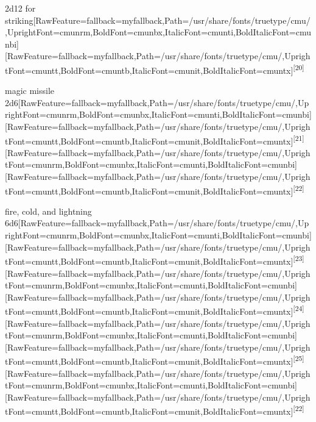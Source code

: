 \begin{myitemize}\item{}2d12 for striking\footnotemark[111]\allowbreak{}\setmainfont{cmunrm.ttf}[RawFeature={fallback=myfallback},Path=/usr/share/fonts/truetype/cmu/,UprightFont=cmunrm,BoldFont=cmunbx,ItalicFont=cmunti,BoldItalicFont=cmunbi]\setmonofont{cmunrm.ttf}[RawFeature={fallback=myfallback},Path=/usr/share/fonts/truetype/cmu/,UprightFont=cmuntt,BoldFont=cmuntb,ItalicFont=cmunit,BoldItalicFont=cmuntx]\textsuperscript{{$\text{[}$}20{$\text{]}$}}
\item{}magic missile 2d6\allowbreak{}\setmainfont{cmunrm.ttf}[RawFeature={fallback=myfallback},Path=/usr/share/fonts/truetype/cmu/,UprightFont=cmunrm,BoldFont=cmunbx,ItalicFont=cmunti,BoldItalicFont=cmunbi]\setmonofont{cmunrm.ttf}[RawFeature={fallback=myfallback},Path=/usr/share/fonts/truetype/cmu/,UprightFont=cmuntt,BoldFont=cmuntb,ItalicFont=cmunit,BoldItalicFont=cmuntx]\textsuperscript{{$\text{[}$}21{$\text{]}$}}\allowbreak{}\setmainfont{cmunrm.ttf}[RawFeature={fallback=myfallback},Path=/usr/share/fonts/truetype/cmu/,UprightFont=cmunrm,BoldFont=cmunbx,ItalicFont=cmunti,BoldItalicFont=cmunbi]\setmonofont{cmunrm.ttf}[RawFeature={fallback=myfallback},Path=/usr/share/fonts/truetype/cmu/,UprightFont=cmuntt,BoldFont=cmuntb,ItalicFont=cmunit,BoldItalicFont=cmuntx]\textsuperscript{{$\text{[}$}22{$\text{]}$}}
\item{}fire, cold, and lightning 6d6\allowbreak{}\setmainfont{cmunrm.ttf}[RawFeature={fallback=myfallback},Path=/usr/share/fonts/truetype/cmu/,UprightFont=cmunrm,BoldFont=cmunbx,ItalicFont=cmunti,BoldItalicFont=cmunbi]\setmonofont{cmunrm.ttf}[RawFeature={fallback=myfallback},Path=/usr/share/fonts/truetype/cmu/,UprightFont=cmuntt,BoldFont=cmuntb,ItalicFont=cmunit,BoldItalicFont=cmuntx]\textsuperscript{{$\text{[}$}23{$\text{]}$}}\allowbreak{}\setmainfont{cmunrm.ttf}[RawFeature={fallback=myfallback},Path=/usr/share/fonts/truetype/cmu/,UprightFont=cmunrm,BoldFont=cmunbx,ItalicFont=cmunti,BoldItalicFont=cmunbi]\setmonofont{cmunrm.ttf}[RawFeature={fallback=myfallback},Path=/usr/share/fonts/truetype/cmu/,UprightFont=cmuntt,BoldFont=cmuntb,ItalicFont=cmunit,BoldItalicFont=cmuntx]\textsuperscript{{$\text{[}$}24{$\text{]}$}}\allowbreak{}\setmainfont{cmunrm.ttf}[RawFeature={fallback=myfallback},Path=/usr/share/fonts/truetype/cmu/,UprightFont=cmunrm,BoldFont=cmunbx,ItalicFont=cmunti,BoldItalicFont=cmunbi]\setmonofont{cmunrm.ttf}[RawFeature={fallback=myfallback},Path=/usr/share/fonts/truetype/cmu/,UprightFont=cmuntt,BoldFont=cmuntb,ItalicFont=cmunit,BoldItalicFont=cmuntx]\textsuperscript{{$\text{[}$}25{$\text{]}$}}\allowbreak{}\setmainfont{cmunrm.ttf}[RawFeature={fallback=myfallback},Path=/usr/share/fonts/truetype/cmu/,UprightFont=cmunrm,BoldFont=cmunbx,ItalicFont=cmunti,BoldItalicFont=cmunbi]\setmonofont{cmunrm.ttf}[RawFeature={fallback=myfallback},Path=/usr/share/fonts/truetype/cmu/,UprightFont=cmuntt,BoldFont=cmuntb,ItalicFont=cmunit,BoldItalicFont=cmuntx]\textsuperscript{{$\text{[}$}22{$\text{]}$}}
\end{myitemize}

